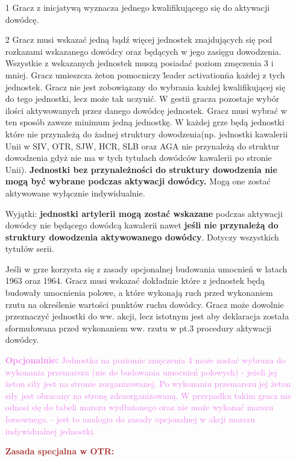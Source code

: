 \begin{itemize}
  \item[1]
        Gracz z inicjatywą wyznacza jednego kwalifikującego się do aktywacji dowódcę.
  \item[2]
        Gracz musi wskazać jedną bądź więcej jednostek znajdujących się pod rozkazami wskazanego dowódcy oraz będących w jego zasięgu dowodzenia.    Wszystkie z wskazanych jednostek muszą posiadać poziom zmęczenia 3 i mniej. Gracz umieszcza żeton pomocniczy \"leader activation\" na każdej z tych jednostek. Gracz nie jest zobowiązany do wybrania każdej kwalifikującej się do tego jednostki, lecz może tak uczynić. W gestii gracza pozostaje wybór ilości aktywowanych przez danego dowódcę jednostek. Gracz musi wybrać w ten sposób zawsze minimum jedną jednostkę. W każdej grze będą jednostki które nie przynależą do żadnej struktury dowodzenia(np. jednostki kawalerii Unii w SIV, OTR, SJW, HCR, SLB oraz AGA nie przynależą do struktur dowodzenia gdyż nie ma w tych tytułach dowódców kawalerii po stronie Unii). \textbf{Jednostki bez przynależności do struktury dowodzenia nie mogą być wybrane podczas aktywacji dowódcy.} Mogą one zostać aktywowane wyłącznie indywidualnie.\par
        Wyjątki: \textbf{jednostki artylerii mogą zostać wskazane} podczas aktywacji dowódcy nie będącego dowódcą kawalerii nawet \textbf{jeśli nie przynależą do struktury dowodzenia aktywowanego dowódcy}. Dotyczy wszystkich tytułów serii.\par
        Jeśli w grze korzysta się z zasady opcjonalnej budowania umocnień w latach 1963 oraz 1964. Gracz musi wskazać dokładnie które z jednostek będą budowały umocnienia polowe, a które wykonają ruch przed wykonaniem rzutu na określenie wartości punktów ruchu dowódcy. Gracz może dowolnie przeznaczyć jednostki do ww. akcji, lecz istotnym jest aby deklaracja została sformułowana przed wykonaniem ww. rzutu w pt.3 procedury aktywacji dowódcy.\par
        \textcolor{violet}{\textbf{Opcjonalnie: }Jednostka na poziomie zmęczenia 4 może zostać wybrana do wykonania przemarszu (nie do budowania umocnień polowych) - jeżeli jej żeton siły jest na stronie zorganizowanej. Po wykonaniu przemarszu jej żeton siły jest obracany na stronę zdezorganizowaną. W przypadku takim gracz nie odnosi się do tabeli marszu wydłużonego oraz nie może wykonać marszu forsownego. - jest to analogia do zasady opcjonalnej w akcji marszu indywidualnej jednostki.}\par
        \textcolor{brown}{\textbf{Zasada specjalna w OTR: }
}
\end{itemize}
